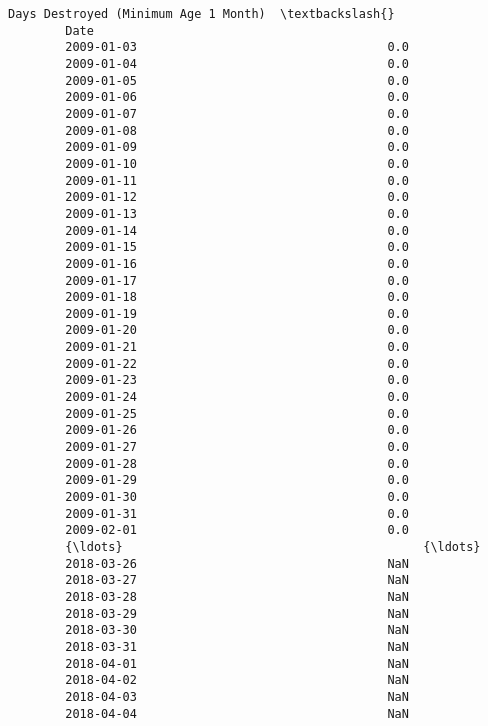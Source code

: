 \documentclass[11pt]{article}
\begin{document}
\begin{Verbatim}[commandchars=\\\{\}]
                    Days Destroyed (Minimum Age 1 Month)  \textbackslash{}
        Date                                               
        2009-01-03                                   0.0   
        2009-01-04                                   0.0   
        2009-01-05                                   0.0   
        2009-01-06                                   0.0   
        2009-01-07                                   0.0   
        2009-01-08                                   0.0   
        2009-01-09                                   0.0   
        2009-01-10                                   0.0   
        2009-01-11                                   0.0   
        2009-01-12                                   0.0   
        2009-01-13                                   0.0   
        2009-01-14                                   0.0   
        2009-01-15                                   0.0   
        2009-01-16                                   0.0   
        2009-01-17                                   0.0   
        2009-01-18                                   0.0   
        2009-01-19                                   0.0   
        2009-01-20                                   0.0   
        2009-01-21                                   0.0   
        2009-01-22                                   0.0   
        2009-01-23                                   0.0   
        2009-01-24                                   0.0   
        2009-01-25                                   0.0   
        2009-01-26                                   0.0   
        2009-01-27                                   0.0   
        2009-01-28                                   0.0   
        2009-01-29                                   0.0   
        2009-01-30                                   0.0   
        2009-01-31                                   0.0   
        2009-02-01                                   0.0   
        {\ldots}                                          {\ldots}   
        2018-03-26                                   NaN   
        2018-03-27                                   NaN   
        2018-03-28                                   NaN   
        2018-03-29                                   NaN   
        2018-03-30                                   NaN   
        2018-03-31                                   NaN   
        2018-04-01                                   NaN   
        2018-04-02                                   NaN   
        2018-04-03                                   NaN   
        2018-04-04                                   NaN   

\end{Verbatim}
\end{document}
